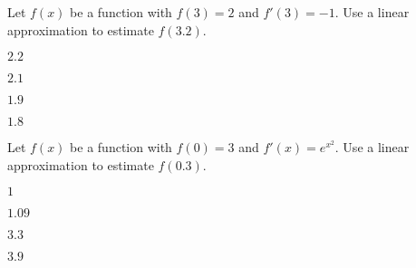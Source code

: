 \begin{readinessAssuranceTest}
\item Let \(f(x)\) be a function with \(f(3)=2\) and \(f'(3)=-1\).  Use a linear approximation to estimate \(f(3.2)\). 
\begin{multicols}{4}
\begin{readinessAssuranceTestChoices}
\item \(2.2\)
\item \(2.1\)
\item \(1.9\)
\item \(1.8\) %
\end{readinessAssuranceTestChoices}
\end{multicols}
\vfill

\item Let \(f(x)\) be a function with \(f(0)=3\) and \(f'(x)=e^{x^2}\).  Use a linear approximation to estimate \(f(0.3)\). 
\begin{multicols}{4}
\begin{readinessAssuranceTestChoices}
\item \(1\)
\item \(1.09\)
\item \(3.3\) %
\item \(3.9\) 
\end{readinessAssuranceTestChoices}
\end{multicols}
\vfill

\end{readinessAssuranceTest}
